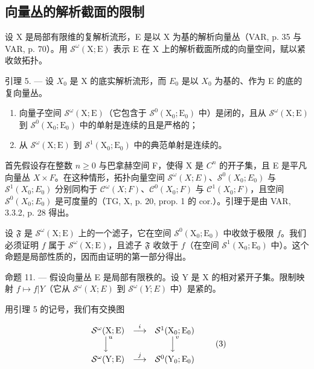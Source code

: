 \subsection{向量丛的解析截面的限制}

设 X 是局部有限维的复解析流形，E 是以 X 为基的解析向量丛（VAR, p. 35 与 VAR, p. 70）。用 \(\mathcal{S}^{\omega}(\mathrm{X};\mathrm{E})\) 表示 E 在 X 上的解析截面所成的向量空间，赋以紧收敛拓扑。

引理 5. --- 设 \(X_{0}\) 是 X 的底实解析流形，而 \(E_{0}\) 是以 \(X_{0}\) 为基的、作为 E 的底的复向量丛。

\begin{enumerate}
\def\labelenumi{\alph{enumi})}
\item
  向量子空间 \(\mathcal{S}^{\omega}(\mathrm{X};\mathrm{E})\)（它包含于 \(\mathcal{S}^{0}(\mathrm{X}_{0};\mathrm{E}_{0})\) 中）是闭的，且从 \(\mathcal{S}^{\omega}(\mathrm{X};\mathrm{E})\) 到 \(\mathcal{S}^{0}(\mathrm{X}_{0};\mathrm{E}_{0})\) 中的单射是连续的且是严格的；
\item
  从 \(\mathcal{S}^{\omega}(\mathrm{X};\mathrm{E})\) 到 \(\mathcal{S}^{1}(\mathrm{X}_{0};\mathrm{E}_{0})\) 中的典范单射是连续的。
\end{enumerate}

首先假设存在整数 \(n \geqslant 0\) 与巴拿赫空间 F，使得 X 是 \(C^{n}\) 的开子集，且 E 是平凡向量丛 \(X \times F\)。在这种情形，拓扑向量空间 \(\mathcal{S}^{\omega}(X;E)\)、\(\mathcal{S}^{0}(X_{0};E_{0})\) 与 \(\mathcal{S}^{1}(X_{0};E_{0})\) 分别同构于 \(\mathcal{C}^{\omega}(X;F)\)、\(\mathcal{C}^{0}(X_{0};F)\) 与 \(\mathcal{C}^{1}(X_{0};F)\)，且空间 \(\mathcal{S}^{0}(X_{0};E_{0})\) 是可度量的（TG, X, p. 20, prop. 1 的 cor.）。引理于是由 VAR, 3.3.2, p. 28 得出。

设 \(\mathfrak{F}\) 是 \(\mathcal{S}^{\omega}(\mathrm{X};\mathrm{E})\) 上的一个滤子，它在空间 \(\mathcal{S}^{0}(\mathrm{X}_{0};\mathrm{E}_{0})\) 中收敛于极限 \(f\)。我们必须证明 \(f\) 属于 \(\mathcal{S}^{\omega}(\mathrm{X};\mathrm{E})\)，且滤子 \(\mathfrak{F}\) 收敛于 \(f\)（在空间 \(\mathcal{S}^{1}(\mathrm{X}_{0};\mathrm{E}_{0})\) 中）。这个命题是局部性质的，因而由证明的第一部分得出。

命题 11. --- 假设向量丛 E 是局部有限秩的。设 Y 是 X 的相对紧开子集。限制映射 \(f \mapsto f|Y\)（它从 \(\mathcal{S}^{\omega}(X;E)\) 到 \(\mathcal{S}^{\omega}(Y;E)\) 中）是紧的。

用引理 5 的记号，我们有交换图

\[
\begin{array}{c c c} \mathcal {S} ^ {\omega} (\mathrm{X}; \mathrm{E}) & \stackrel {{i}} {{\longrightarrow}} & \mathcal {S} ^ {1} (\mathrm{X} _ {0}; \mathrm{E} _ {0}) \\ \Big \downarrow^ {u} & & \Big \downarrow^ {v} \\ \mathcal {S} ^ {\omega} (\mathrm{Y}; \mathrm{E}) & \stackrel {{j}} {{\longrightarrow}} & \mathcal {S} ^ {0} (\mathrm{Y} _ {0}; \mathrm{E} _ {0}) \end{array}\tag{3}
\]

